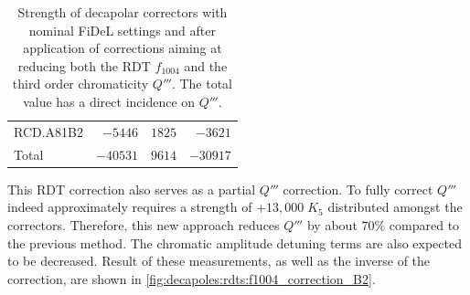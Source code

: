 \begin{table}[!htb]
\begin{tabular}{lrrr}
    \hspace{2mm}RCD.A81B2 &$-5446$ & $1825 $ &  $-3621 $\\
    \hspace{2mm}Total     &$-40531$& $9614 $ &  $-30917$      \\
    \bottomrule
    \end{tabular}
    \caption{Strength of decapolar correctors with nominal FiDeL settings and after application of
    corrections aiming at reducing both the RDT $f_{1004}$ and the third order chromaticity $Q'''$. The total value has a direct
    incidence on $Q'''$.}
    \label{tab:decapoles:rdts:correction_f1004_k5}
\end{table}

This RDT correction also serves as a partial $Q'''$ correction. To fully correct $Q'''$ indeed
approximately requires a strength of $+13,000 \;K_5$ distributed amongst the correctors. Therefore,
this new approach reduces $Q'''$ by about $70\%$ compared to the previous method. The chromatic
amplitude detuning terms are also expected to be decreased.
Result of these measurements, as well as the inverse of the correction, are shown in
\cref{fig:decapoles:rdts:f1004_correction_B2}.

